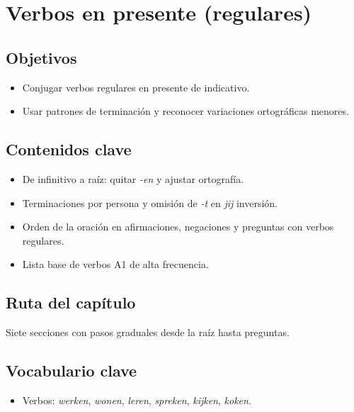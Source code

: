 \chapter{Verbos en presente (regulares)}
\section{Objetivos}
\begin{itemize}[leftmargin=*]
	\item Conjugar verbos regulares en presente de indicativo.
	\item Usar patrones de terminación y reconocer variaciones ortográficas menores.
\end{itemize}

\section{Contenidos clave}
\begin{itemize}[leftmargin=*]
	\item De infinitivo a raíz: quitar \textit{-en} y ajustar ortografía.
	\item Terminaciones por persona y omisión de \textit{-t} en \textit{jij} inversión.
	\item Orden de la oración en afirmaciones, negaciones y preguntas con verbos regulares.
	\item Lista base de verbos A1 de alta frecuencia.
\end{itemize}

\section{Ruta del capítulo}
Siete secciones con pasos graduales desde la raíz hasta preguntas.









\section{Vocabulario clave}
\begin{itemize}[leftmargin=*]
	\item Verbos: \textit{werken}, \textit{wonen}, \textit{leren}, \textit{spreken}, \textit{kijken}, \textit{koken}.
\end{itemize}

